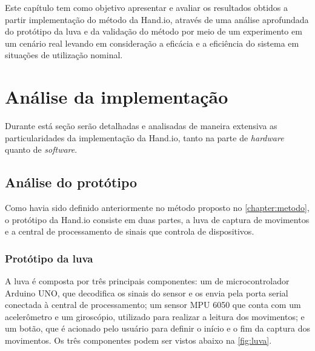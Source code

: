 \label{chapter:resultados}
Este capítulo tem como objetivo apresentar e avaliar os resultados obtidos a partir implementação do método da Hand.io, através de uma análise aprofundada do protótipo da luva e da validação do método por meio de um experimento em um cenário real levando em consideração a eficácia e a eficiência do sistema em situações de utilização nominal.

\section{Análise da implementação}

Durante está seção serão detalhadas e analisadas de maneira extensiva as particularidades da implementação da Hand.io, tanto na parte de \textit{hardware} quanto de \textit{software}.

\subsection{Análise do protótipo}

Como havia sido definido anteriormente no método proposto no \autoref{chapter:metodo}, o protótipo da Hand.io consiste em duas partes, a luva de captura de movimentos e a central de processamento de sinais que controla de dispositivos.

\subsubsection{Protótipo da luva}

A luva é composta por três principais componentes: um de microcontrolador Arduino UNO, que decodifica os sinais do sensor e os envia pela porta serial conectada à central de processamento; um sensor MPU 6050 que conta com um acelerômetro e um giroscópio, utilizado para realizar a leitura dos movimentos; e um botão, que é acionado pelo usuário para definir o início e o fim da captura dos movimentos. Os três componentes podem ser vistos abaixo na \autoref{fig:luva}.

